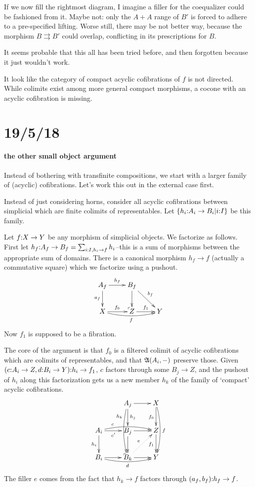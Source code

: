 \documentclass[csh.tex]{subfiles}
\makeatletter
\newcommand\pushout{\ar@{}[dr]|(.9)\ulcorner}
\makeatother
\begin{document}
If we now fill the rightmost diagram, I imagine a filler for the coequalizer could be fashioned from it. Maybe not: only the $A+A$ range of $B'$ is forced to adhere to a pre-specified lifting. Worse still, there may be not better way, because the morphism $B\rightrightarrows B'$ could overlap, conflicting in its prescriptions for $B$.

It seems probable that this all has been tried before, and then forgotten because it just wouldn't work. 

It look like the category of compact acyclic cofibrations of $f$ is not directed. While colimits exist among more general compact morphisms, a cocone with an acyclic cofibration is missing. 


\section{19/5/18}

\paragraph{the other small object argument}
Instead of bothering with transfinite compositions, we start with a larger family of (acyclic) cofibrations. Let's work this out in the external case first.

Instead of just considering horns, consider all acyclic cofibrations between simplicial which are finite colimits of representables. Let $\left\{h_i\mathord : A_i \to B_i |i\mathord : I\right\}$ be this family.

Let $f\mathord : X\to Y$ be any morphism of simplicial objects. We factorize as follows. First let $h_f\mathord : A_f\to B_f = \sum_{ i\mathord : I, h_i\to f } h_i$--this is a sum of morphisms between the appropriate sum of domains. There is a canonical morphism $h_f\to f$ (actually a commutative square) which we factorize using a pushout.
\[\xymatrix{
A_f\ar[r]^{h_f}\ar[d]_{a_f}\pushout & B_f\ar[d]\ar[dr]^{b_f} \\
X \ar[r]^{f_0}\ar@/_/[rr]_f & Z \ar[r]^{f_1} & Y
}\]
Now $f_1$ is supposed to be a fibration.

The core of the argument is that $f_0$ is a filtered colimit of acyclic cofibrations which are colimits of representables, and that $\mathfrak A(A_i,-)$ preserve those. Given $(c\mathord : A_i\to Z,d\mathord : B_i\to Y)\mathord : h_i\to f_1$, $c$ factors through some $B_j\to Z$, and the pushout of $h_i$ along this factorization gets us a new member $h_k$ of the family of `compact' acyclic cofibrations.
\[ \xymatrix{
 & A_j\ar@/_/[dd]_(.25){h_k}\ar[d]^{h_j} \ar[r] & X\ar[d]_{f_0} \ar@/^/[dd]^f\\
A_i \ar[d]_{h_i} \ar[r]_{c'} \ar@/^/[rr]^(.25)c \pushout & B_j \ar[r]\ar[d] &Z\ar[d]_{f_1}\\
B_i \ar[r]\ar@/_/[rr]_{d} & B_k\ar[r]\ar@{.>}[ur]^e & Y
}\]
The filler $e$ comes from the fact that $h_k\to f$ factors through $(a_f,b_f)\mathord : h_f\to f$.
\end{document}
